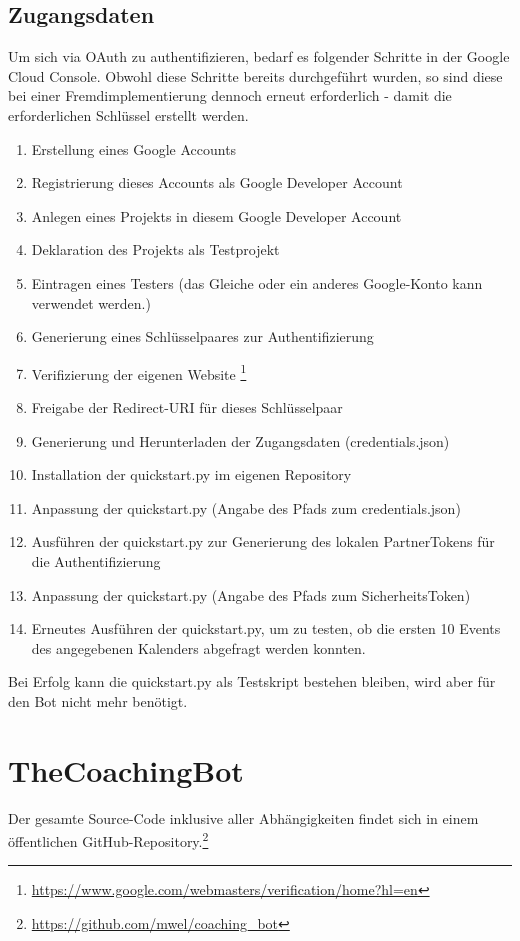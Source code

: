             \subsection{Zugangsdaten}
                Um sich via OAuth zu authentifizieren, bedarf es folgender Schritte in der Google Cloud Console. Obwohl diese Schritte bereits durchgeführt wurden, so sind diese bei einer Fremdimplementierung dennoch erneut erforderlich - damit die erforderlichen Schlüssel erstellt werden. 
                \begin{enumerate}
                    \item Erstellung eines Google Accounts
                    \item Registrierung dieses Accounts als Google Developer Account
                    \item Anlegen eines Projekts in diesem Google Developer Account
                    \item Deklaration des Projekts als Testprojekt
                    \item Eintragen eines Testers (das Gleiche oder ein anderes Google-Konto kann verwendet werden.)
                    \item Generierung eines Schlüsselpaares zur Authentifizierung
                    \item Verifizierung der eigenen Website \footnote{\url{https://www.google.com/webmasters/verification/home?hl=en}}
                    \item Freigabe der Redirect-URI für dieses Schlüsselpaar
                    \item Generierung und Herunterladen der Zugangsdaten (credentials.json)
                    \item Installation der quickstart.py im eigenen Repository
                    \item Anpassung der quickstart.py (Angabe des Pfads zum credentials.json)
                    \item Ausführen der quickstart.py zur Generierung des lokalen Partner\-Tokens für die Authentifizierung
                    \item Anpassung der quickstart.py (Angabe des Pfads zum Sicherheits\-Token)
                    \item Erneutes Ausführen der quickstart.py, um zu testen, ob die ersten 10 Events des angegebenen Kalenders abgefragt werden konnten.                    
                \end{enumerate}
                Bei Erfolg kann die quickstart.py als Testskript bestehen bleiben, wird aber für den Bot nicht mehr benötigt.


    \section{TheCoachingBot}
        Der gesamte Source-Code inklusive aller Abhängigkeiten findet sich in einem öffentlichen GitHub-Repository.\footnote{\url{https://github.com/mwel/coaching_bot}}